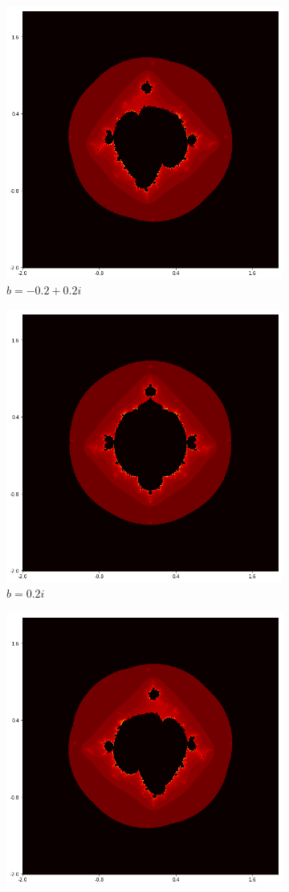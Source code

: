 \documentclass{amsart}
\theoremstyle{definition}
\theoremstyle{remark}
\numberwithin{equation}{section}
\begin{document}
\begin{figure}[h]
\centering
\begin{subfigure}{.32\textwidth}
  \centering
  \includegraphics[width=.7\linewidth]{ShiftLocus3b1.png}
  \caption{$b=-0.2+0.2i$}
\end{subfigure}%
\begin{subfigure}{.32\textwidth}
  \centering
  \includegraphics[width=.7\linewidth]{ShiftLocus3b2.png}
  \caption{$b=0.2i$}
\end{subfigure}
\begin{subfigure}{.32\textwidth}
  \centering
  \includegraphics[width=.7\linewidth]{ShiftLocus3b3.png}

\end{subfigure}
\end{figure}
\end{document}
